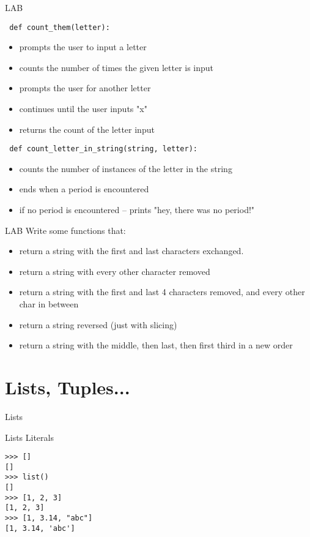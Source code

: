 \documentclass{beamer}
\begin{document}
\begin{frame}[fragile]{LAB}

\verb| def count_them(letter): |
\begin{itemize}
  \item prompts the user to input a letter
  \item counts the number of times the given letter is input
  \item prompts the user for another letter
  \item continues until the user inputs "x"
  \item returns the count of the letter input
\end{itemize}

\verb| def count_letter_in_string(string, letter): |
\begin{itemize}
  \item counts the number of instances of the letter in the string
  \item ends when a period is encountered
  \item if no period is encountered -- prints "hey, there was no period!"
\end{itemize}
\end{frame}

\begin{frame}[fragile]{LAB}
Write some functions that:
\begin{itemize}
  \item return a string with the first and last characters exchanged.
  \item return a string with every other character removed
  \item return a string with the first and last 4 characters removed, and every other char in between
  \item return a string reversed (just with slicing)
  \item return a string with the middle, then last, then first third in a new order
\end{itemize}

\end{frame}


\section{Lists, Tuples...}

\begin{frame}[fragile]{Lists}

 {\Large Lists Literals}

\begin{verbatim}
>>> []
[]
>>> list()
[]
>>> [1, 2, 3]
[1, 2, 3]
>>> [1, 3.14, "abc"]
[1, 3.14, 'abc']
\end{verbatim}

\end{frame} 
\end{document}

